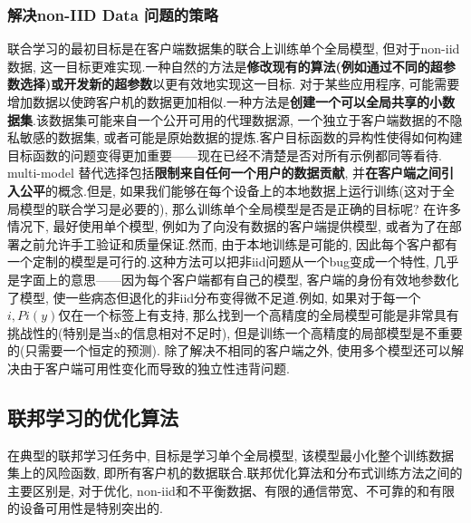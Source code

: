 \subsubsection{解决non-IID Data 问题的策略}
联合学习的最初目标是在客户端数据集的联合上训练单个全局模型, 但对于non-iid数据, 这一目标更难实现.一种自然的方法是\textbf{修改现有的算法(例如通过不同的超参数选择)或开发新的超参数}以更有效地实现这一目标.
对于某些应用程序, 可能需要增加数据以使跨客户机的数据更加相似.一种方法是\textbf{创建一个可以全局共享的小数据集}.该数据集可能来自一个公开可用的代理数据源, 一个独立于客户端数据的不隐私敏感的数据集, 或者可能是原始数据的提炼.客户目标函数的异构性使得如何构建目标函数的问题变得更加重要——现在已经不清楚是否对所有示例都同等看待.
multi-model
替代选择包括\textbf{限制来自任何一个用户的数据贡献}, 并\textbf{在客户端之间引入公平}的概念.但是, 如果我们能够在每个设备上的本地数据上运行训练(这对于全局模型的联合学习是必要的), 那么训练单个全局模型是否是正确的目标呢?
在许多情况下, 最好使用单个模型, 例如为了向没有数据的客户端提供模型, 或者为了在部署之前允许手工验证和质量保证.然而, 由于本地训练是可能的, 因此每个客户都有一个定制的模型是可行的.这种方法可以把非iid问题从一个bug变成一个特性, 几乎是字面上的意思——因为每个客户端都有自己的模型, 客户端的身份有效地参数化了模型, 使一些病态但退化的非iid分布变得微不足道.例如, 如果对于每一个$i,  Pi(y)$仅在一个标签上有支持, 那么找到一个高精度的全局模型可能是非常具有挑战性的(特别是当x的信息相对不足时), 但是训练一个高精度的局部模型是不重要的(只需要一个恒定的预测).
除了解决不相同的客户端之外, 使用多个模型还可以解决由于客户端可用性变化而导致的独立性违背问题.
\subsection{联邦学习的优化算法}
在典型的联邦学习任务中, 目标是学习单个全局模型, 该模型最小化整个训练数据集上的风险函数, 即所有客户机的数据联合.联邦优化算法和分布式训练方法之间的主要区别是, 对于优化, non-iid和不平衡数据、有限的通信带宽、不可靠的和有限的设备可用性是特别突出的.

